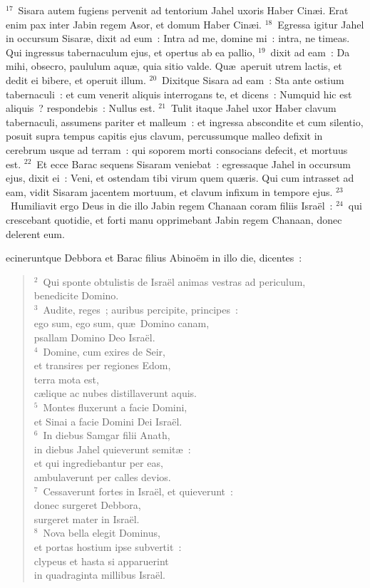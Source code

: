 ${}^{17}$~Sisara autem fugiens pervenit ad tentorium Jahel uxoris Haber Cin\ae i. Erat enim pax inter Jabin regem Asor, et domum Haber Cin\ae i.
${}^{18}$~Egressa igitur Jahel in occursum Sisar\ae , dixit ad eum~: Intra ad me, domine mi~: intra, ne timeas. Qui ingressus tabernaculum ejus, et opertus ab ea pallio,
${}^{19}$~dixit ad eam~: Da mihi, obsecro, paululum aqu\ae , quia sitio valde. Qu\ae\ aperuit utrem lactis, et dedit ei bibere, et operuit illum.
${}^{20}$~Dixitque Sisara ad eam~: Sta ante ostium tabernaculi~: et cum venerit aliquis interrogans te, et dicens~: Numquid hic est aliquis~? respondebis~: Nullus est.
${}^{21}$~Tulit itaque Jahel uxor Haber clavum tabernaculi, assumens pariter et malleum~: et ingressa abscondite et cum silentio, posuit supra tempus capitis ejus clavum, percussumque malleo defixit in cerebrum usque ad terram~: qui soporem morti consocians defecit, et mortuus est.
${}^{22}$~Et ecce Barac sequens Sisaram veniebat~: egressaque Jahel in occursum ejus, dixit ei~: Veni, et ostendam tibi virum quem qu\ae ris. Qui cum intrasset ad eam, vidit Sisaram jacentem mortuum, et clavum infixum in tempore ejus.
${}^{23}$~Humiliavit ergo Deus in die illo Jabin regem Chanaan coram filiis Isra\"el~:
${}^{24}$~qui crescebant quotidie, et forti manu opprimebant Jabin regem Chanaan, donec delerent eum.

\bchapter
{}ecineruntque Debbora et Barac filius Abino\"em in illo die, dicentes~:
\begin{verse}${}^{2}$~Qui sponte obtulistis de Isra\"el animas vestras ad periculum,\\ benedicite Domino.\\
${}^{3}$~Audite, reges~; auribus percipite, principes~:\\ ego sum, ego sum, qu\ae\ Domino canam,\\ psallam Domino Deo Isra\"el.\\
${}^{4}$~Domine, cum exires de Seir,\\ et transires per regiones Edom,\\ terra mota est,\\ c\ae lique ac nubes distillaverunt aquis.\\
${}^{5}$~Montes fluxerunt a facie Domini,\\ et Sinai a facie Domini Dei Isra\"el.\\
${}^{6}$~In diebus Samgar filii Anath,\\ in diebus Jahel quieverunt semit\ae~:\\ et qui ingrediebantur per eas,\\ ambulaverunt per calles devios.\\
${}^{7}$~Cessaverunt fortes in Isra\"el, et quieverunt~:\\ donec surgeret Debbora,\\ surgeret mater in Isra\"el.\\
${}^{8}$~Nova bella elegit Dominus,\\ et portas hostium ipse subvertit~:\\ clypeus et hasta si apparuerint\\ in quadraginta millibus Isra\"el.\end{verse}


